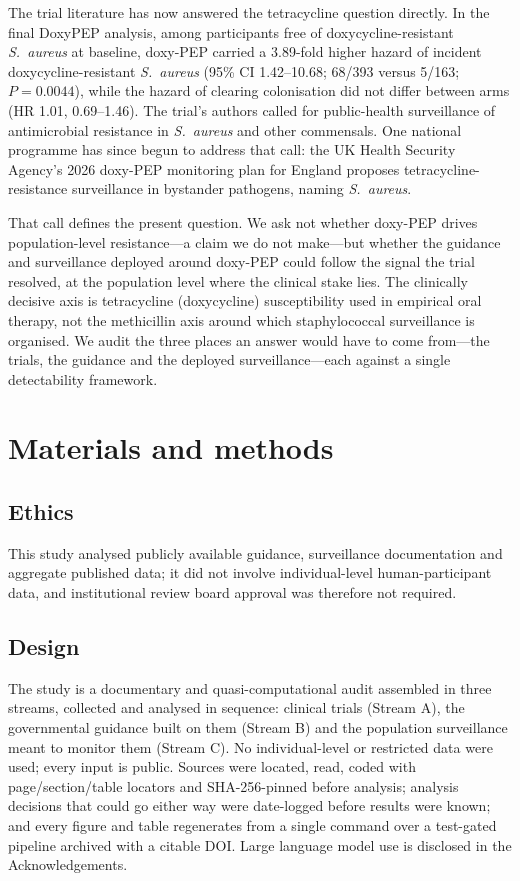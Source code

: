 \documentclass[12pt,a4paper]{article}
\newcommand{\sa}{\emph{S.~aureus}}
\begin{document}
The trial literature has now answered the tetracycline question directly.
In the final DoxyPEP analysis, among participants free of
doxycycline-resistant \sa{} at baseline, doxy-PEP carried a 3.89-fold higher
hazard of incident doxycycline-resistant \sa{} (95\% CI 1.42--10.68; 68/393
versus 5/163; $P=0.0044$), while the hazard of clearing colonisation did not
differ between arms (HR 1.01, 0.69--1.46).\cite{luetkemeyer2025} The trial's
authors called for public-health surveillance of antimicrobial resistance in
\sa{} and other commensals. One national programme has since begun to address that call:
the UK Health Security Agency's 2026 doxy-PEP monitoring plan for England
proposes tetracycline-resistance surveillance in bystander pathogens, naming
\sa{}.\cite{ukhsa2026}

That call defines the present question. We ask not whether doxy-PEP drives
population-level resistance---a claim we do not make---but whether the guidance
and surveillance deployed around doxy-PEP could follow the signal the trial
resolved, at the population level where the clinical stake lies. The clinically
decisive axis is tetracycline (doxycycline) susceptibility used in empirical oral
therapy, not the methicillin axis around which staphylococcal surveillance is
organised. We audit the three places an answer would have to come from---the
trials, the guidance and the deployed surveillance---each against a single
detectability framework.

\section*{Materials and methods}

\subsection*{Ethics}
This study analysed publicly available guidance, surveillance documentation and
aggregate published data; it did not involve individual-level human-participant
data, and institutional review board approval was therefore not required.

\subsection*{Design}
The study is a documentary and quasi-computational audit assembled in three
streams, collected and analysed in sequence: clinical trials (Stream A), the
governmental guidance built on them (Stream B) and the population surveillance
meant to monitor them (Stream C). No individual-level or restricted data were
used; every input is public. Sources were
located, read, coded with page/section/table locators and SHA-256-pinned before
analysis; analysis decisions that could go either way were date-logged before
results were known; and every figure and table regenerates from a single command
over a test-gated pipeline archived with a citable
DOI.\cite{armond2024integrity} Large language model use is disclosed in the Acknowledgements.
\end{document}
